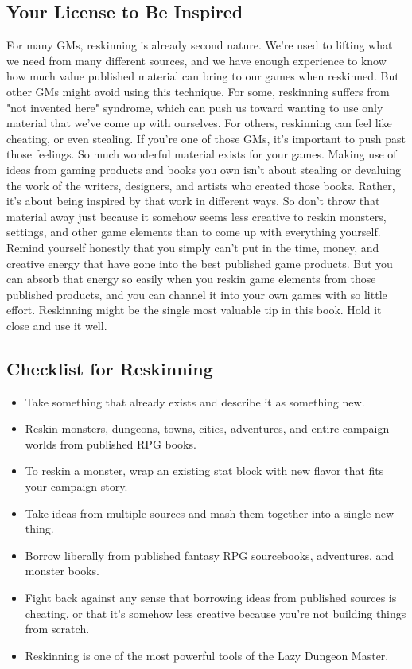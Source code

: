 \documentclass[10pt,a4paper,twoside,bg=print,twocolumn,openany,nodeprecatedcode]{dndbook}
\begin{document}
\subsection{Your License to Be Inspired}
For many GMs, reskinning is already second nature. We're used to lifting what we need from many different sources, and we have enough experience to know how much value published material can bring to our games when reskinned. But other GMs might avoid using this technique. For some, reskinning suffers from "not invented here" syndrome, which can push us toward wanting to use only material that we've come up with ourselves. For others, reskinning can feel like cheating, or even stealing.
If you're one of those GMs, it's important to push past those feelings. So much wonderful material exists for your games. Making use of ideas from gaming products and books you own isn't about stealing or devaluing the work of the writers, designers, and artists who created those books. Rather, it's about being inspired by that work in different ways. So don't throw that material away just because it somehow seems less creative to reskin monsters, settings, and other game elements than to come up with everything yourself.
Remind yourself honestly that you simply can't put in the time, money, and creative energy that have gone into the best published game products. But you can absorb that energy so easily when you reskin game elements from those published products, and you can channel it into your own games with so little effort.
Reskinning might be the single most valuable tip in this book. Hold it close and use it well.
\subsection{Checklist for Reskinning}

\begin{itemize}
\item Take something that already exists and describe it as something new.
\item Reskin monsters, dungeons, towns, cities, adventures, and entire campaign worlds from published RPG books.
\item To reskin a monster, wrap an existing stat block with new flavor that fits your campaign story.
\item Take ideas from multiple sources and mash them together into a single new thing.
\item Borrow liberally from published fantasy RPG sourcebooks, adventures, and monster books.
\item Fight back against any sense that borrowing ideas from published sources is cheating, or that it's somehow less creative because you're not building things from scratch.
\item Reskinning is one of the most powerful tools of the Lazy Dungeon Master.
\end{itemize}
\end{document}
